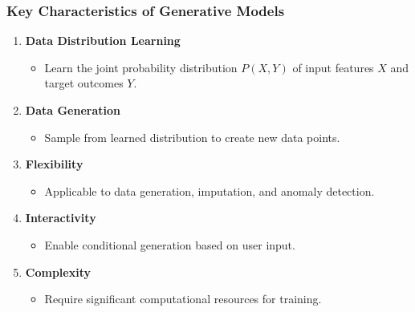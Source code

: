 \documentclass[aspectratio=169]{beamer}
\begin{document}
\begin{frame}[fragile]
    \frametitle{Key Characteristics of Generative Models}
    
    \begin{enumerate}
        \item \textbf{Data Distribution Learning}
            \begin{itemize}
                \item Learn the joint probability distribution \( P(X, Y) \) of input features \( X \) and target outcomes \( Y \).
            \end{itemize}
        \item \textbf{Data Generation}
            \begin{itemize}
                \item Sample from learned distribution to create new data points.
            \end{itemize}
        \item \textbf{Flexibility}
            \begin{itemize}
                \item Applicable to data generation, imputation, and anomaly detection.
            \end{itemize}
        \item \textbf{Interactivity}
            \begin{itemize}
                \item Enable conditional generation based on user input.
            \end{itemize}
        \item \textbf{Complexity}
            \begin{itemize}
                \item Require significant computational resources for training.
            \end{itemize}
    \end{enumerate}
\end{frame}
\end{document}
